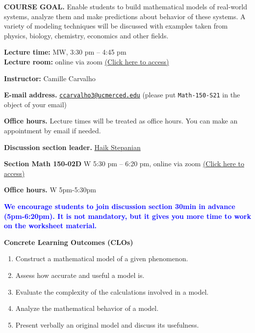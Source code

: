 \documentclass{article}
\begin{document}
\textbf{COURSE GOAL.} Enable students to build mathematical models of real-world systems, analyze them and make predictions about behavior of these systems. 
A variety of modeling techniques will be discussed with examples taken from physics, biology, chemistry, economics and other fields. 

\textbf{Lecture time:} MW, 3:30 pm -- 4:45 pm\\
\textbf{Lecture room:} online via zoom \href{https://ucmerced.zoom.us/meeting/register/tZEqcOmrrzojHNEMAVa5yrDoID3ObUflidPc}{(Click here to access)}

 {\bf Instructor:} Camille Carvalho
\begin{description}
   \item {\bf E-mail address.}  \href{mailto:ccarvalho3@ucmerced.edu}{\texttt{ccarvalho3@ucmerced.edu}}  (please put {\tt Math-150-S21} in the object of your email)
  \item {\bf Office hours.} Lecture times will be treated as office hours. You can make an appointment by email if needed.
\end{description}

\textbf{Discussion section leader.} \href{mailto:hstepanian@ucmerced.edu}{Haik Stepanian}
\begin{description}
\item \textbf{Section Math 150-02D} W 5:30 pm -- 6:20 pm, online via zoom 
\href{ https://ucmerced.zoom.us/meeting/register/tZwpcOmrrDojG9UFD4lreMytMs0ECmwD0BBP}{(Click here to access)}
\item \textbf{Office hours.} W 5pm-5:30pm
\end{description}
\textbf{\textcolor{blue}{We encourage students to join discussion section 30min in advance (5pm-6:20pm). It is not mandatory, but it gives you more time to work on the worksheet material.}}

\textbf{Concrete Learning Outcomes (CLOs)} 
\begin{enumerate}
\item Construct a mathematical model of a given phenomenon.
\item Assess how accurate and useful a model is.
\item Evaluate the complexity of the calculations involved in a model.
\item Analyze the mathematical behavior of a model.
\item Present verbally an original model and discuss its usefulness.
\end{enumerate}
\end{document}
